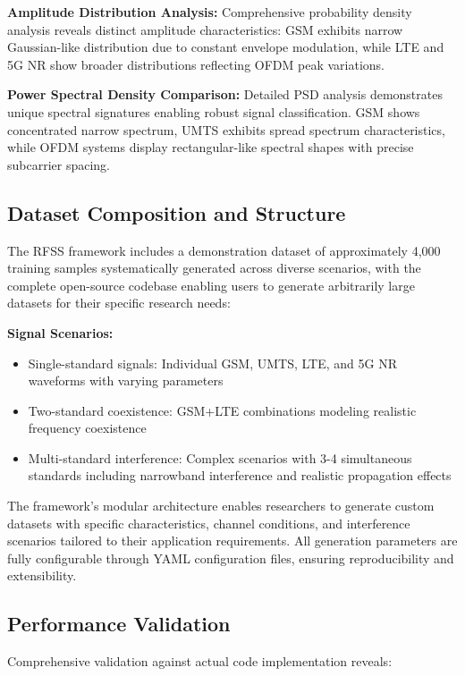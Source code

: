 \documentclass[twocolumn]{article}
\begin{document}
\textbf{Amplitude Distribution Analysis:} Comprehensive probability density analysis reveals distinct amplitude characteristics: GSM exhibits narrow Gaussian-like distribution due to constant envelope modulation, while LTE and 5G NR show broader distributions reflecting OFDM peak variations.

\textbf{Power Spectral Density Comparison:} Detailed PSD analysis demonstrates unique spectral signatures enabling robust signal classification. GSM shows concentrated narrow spectrum, UMTS exhibits spread spectrum characteristics, while OFDM systems display rectangular-like spectral shapes with precise subcarrier spacing.

\subsection{Dataset Composition and Structure}

The RFSS framework includes a demonstration dataset of approximately 4,000 training samples systematically generated across diverse scenarios, with the complete open-source codebase enabling users to generate arbitrarily large datasets for their specific research needs:

\textbf{Signal Scenarios:}
\begin{itemize}
\item Single-standard signals: Individual GSM, UMTS, LTE, and 5G NR waveforms with varying parameters
\item Two-standard coexistence: GSM+LTE combinations modeling realistic frequency coexistence
\item Multi-standard interference: Complex scenarios with 3-4 simultaneous standards including narrowband interference and realistic propagation effects
\end{itemize}

The framework's modular architecture enables researchers to generate custom datasets with specific characteristics, channel conditions, and interference scenarios tailored to their application requirements. All generation parameters are fully configurable through YAML configuration files, ensuring reproducibility and extensibility.

\subsection{Performance Validation}

Comprehensive validation against actual code implementation reveals:
\end{document}
